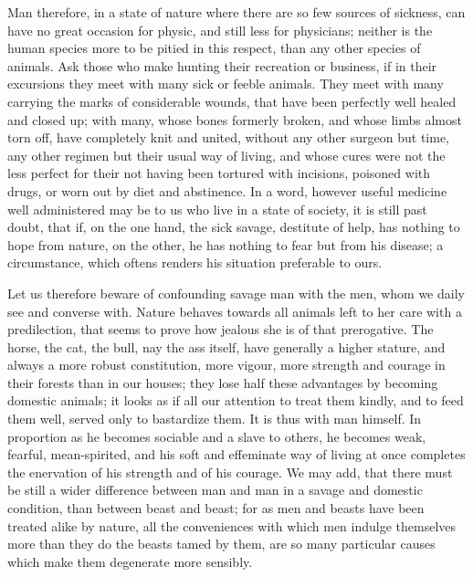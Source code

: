\documentclass[11pt,twocolumn]{ltugboat}
\begin{document}
Man therefore, in a state of nature where there are so few sources of
sickness, can have no great occasion for physic, and still less for
physicians; neither is the human species more to be pitied in this
respect, than any other species of animals. Ask those who make hunting
their recreation or business, if in their excursions they meet with
many sick or feeble animals. They meet with many carrying the marks of
considerable wounds, that have been perfectly well healed and closed
up; with many, whose bones formerly broken, and whose limbs almost
torn off, have completely knit and united, without any other surgeon
but time, any other regimen but their usual way of living, and whose
cures were not the less perfect for their not having been tortured
with incisions, poisoned with drugs, or worn out by diet and
abstinence. In a word, however useful medicine well administered may
be to us who live in a state of society, it is still past doubt, that
if, on the one hand, the sick savage, destitute of help, has nothing
to hope from nature, on the other, he has nothing to fear but from his
disease; a circumstance, which oftens renders his situation preferable
to ours.

Let us therefore beware of confounding savage man with the men, whom
we daily see and converse with. Nature behaves towards all animals
left to her care with a predilection, that seems to prove how jealous
she is of that prerogative. The horse, the cat, the bull, nay the ass
itself, have generally a higher stature, and always a more robust
constitution, more vigour, more strength and courage in their forests
than in our houses; they lose half these advantages by becoming
domestic animals; it looks as if all our attention to treat them
kindly, and to feed them well, served only to bastardize them. It is
thus with man himself. In proportion as he becomes sociable and a
slave to others, he becomes weak, fearful, mean-spirited, and his soft
and effeminate way of living at once completes the enervation of his
strength and of his courage. We may add, that there must be still a
wider difference between man and man in a savage and domestic
condition, than between beast and beast; for as men and beasts have
been treated alike by nature, all the conveniences with which men
indulge themselves more than they do the beasts tamed by them, are so
many particular causes which make them degenerate more sensibly.
\end{document}

